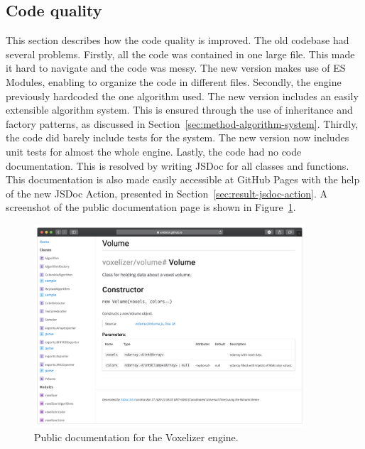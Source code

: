 \subsection{Code quality}
This section describes how the code quality is improved. The old codebase had several problems. Firstly, all the code was contained in one large file. This made it hard to navigate and the code was messy. The new version makes use of ES Modules, enabling to organize the code in different files. Secondly, the engine previously hardcoded the one algorithm used. The new version includes an easily extensible algorithm system. This is ensured through the use of inheritance and factory patterns, as discussed in Section~\ref{sec:method-algorithm-system}. Thirdly, the code did barely include tests for the system. The new version now includes unit tests for almost the whole engine. Lastly, the code had no code documentation. This is resolved by writing JSDoc for all classes and functions. This documentation is also made easily accessible at GitHub Pages with the help of the new JSDoc Action, presented in Section~\ref{sec:result-jsdoc-action}. A screenshot of the public documentation page is shown in Figure~\ref{fig:result-voxelizer-documentation}.
\begin{figure}[htp]
    \centering
    \includegraphics[width=0.9\textwidth]{sections/result/figures/voxelizer-documentation.png}
    \caption{Public documentation for the Voxelizer engine.}
    \label{fig:result-voxelizer-documentation}
\end{figure}

